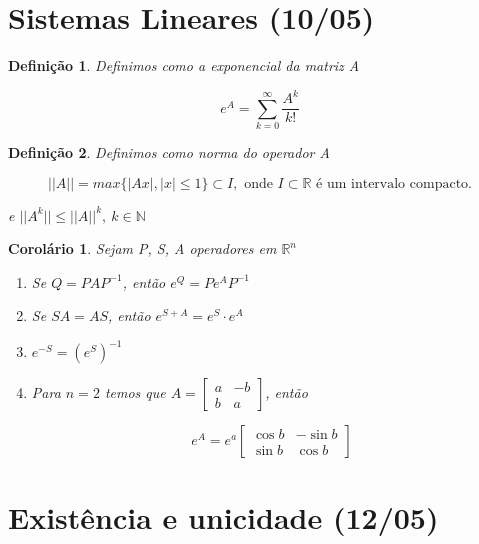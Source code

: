 \documentclass[12pt]{article}
\newtheorem{corollary}{Corolário}[theorem]
\newtheorem{definition}{Definição}
\begin{document}
\section{Sistemas Lineares (10/05)}
\begin{definition}
    Definimos como a exponencial da matriz A
    
    $$e^A = \sum_{k = 0}^\infty \frac{A^k}{k!}$$
\end{definition}

\begin{definition}
    Definimos como norma do operador A
    
    $$||A|| = max \{ |Ax|, |x| \leq 1 \} \subset I, \text{ onde } I \subset \mathbb{R} \text{ é um intervalo compacto.}$$
    
    e $||A^k|| \leq ||A||^k, \ k \in \mathbb{N}$ 
\end{definition}

\begin{corollary}
    Sejam P, S, A operadores em $\mathbb{R}^n$
    
    \begin{enumerate}
        \item Se $Q = P A P^{-1}$, então $e^Q = P e^A P^{-1}$
        
        \item Se $S A = A S$, então $e^{S + A} = e^S \cdot    e^A$
        
        \item $e^{-S} = (e^S)^{-1}$
        
        \item Para $n = 2$ temos que $ A = \left [ \begin{array}{cc}
             a & -b \\
             b & a
        \end{array} \right ]$, então
        
        $$e^A = e^a \left [ \begin{array}{cc}
             \cos{b} & -\sin{b} \\
             \sin{b} & \cos{b}
        \end{array} \right ]$$
    \end{enumerate}
\end{corollary}

\section{Existência e unicidade (12/05)}
\end{document}
